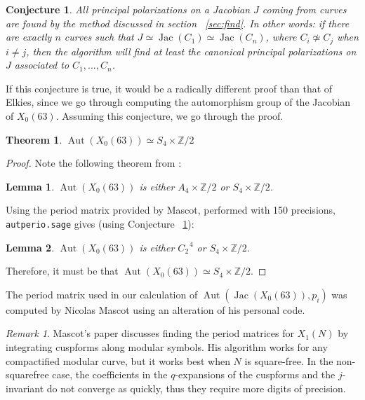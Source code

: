 \documentclass[12pt,reqno]{amsart}
\DeclareMathOperator{\Aut}{Aut}
\DeclareMathOperator{\Jac}{Jac}
\newcommand{\Z}{\mathbb{Z}}
\newtheorem*{thm*}{Theorem}
\newtheorem*{lemma*}{Lemma}
\newtheorem{conjecture}[theorem]{Conjecture}
\theoremstyle{definition}
\theoremstyle{remark}
\newtheorem*{remark}{Remark}
\begin{document}
\begin{conjecture} \label{63conj}  All principal polarizations on a Jacobian $J$ coming from curves are found by the method discussed in section ~\ref{sec:find}.  In other words: if there are exactly $n$ curves such that $J \simeq \Jac(C_1) \simeq \Jac(C_n)$, where $C_i \nsimeq C_j$ when $i \neq j$, then the algorithm will find at least the canonical principal polarizations on $J$ associated to $C_1, ..., C_n$.
\end{conjecture} 

If this conjecture is true, it would be a radically different proof than that of Elkies, since we go through computing the automorphism group of the Jacobian of $X_0(63)$. Assuming this conjecture, we go through the proof.

\begin{thm*} $\Aut(X_0(63)) \simeq S_4 \times \Z/2$ \end{thm*} 

\begin{proof} Note the following theorem from \cite{km}: 

\begin{lemma*} $\Aut(X_0(63))$ is either $A_4 \times \Z/2$ or $S_4 \times \Z/2$. 
\end{lemma*}

Using the period matrix provided by Mascot, performed with 150 precisions, \texttt{autperio.sage} gives (using Conjecture ~\ref{63conj}):

\begin{lemma*} $\Aut(X_0(63))$ is either $C_2^{\text{ }4}$ or $S_4 \times \Z/2$.
\end{lemma*}

Therefore, it must be that $\Aut(X_0(63)) \simeq S_4 \times \Z/2$. 
\end{proof} 

\vspace{+10pt} 
The period matrix used in our calculation of $\Aut(\Jac(X_0(63)), p_i)$ was computed by Nicolas Mascot using an alteration of his personal code.

\begin{remark} Mascot's paper \cite{n} discusses finding the period matrices for $X_1(N)$ by integrating cuspforms along modular symbols. His algorithm works for any compactified modular curve, but it works best when $N$ is square-free. In the non-squarefree case, the coefficients in the $q$-expansions of the cuspforms and the $j$-invariant do not converge as quickly, thus they require more digits of precision. \end{remark}
\end{document}
